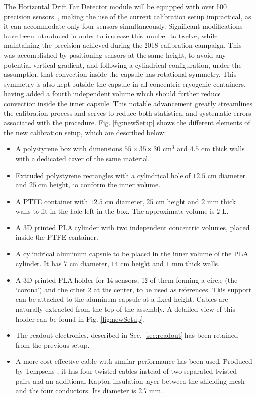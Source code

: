 \noindent The Horizontal Drift Far Detector module will be equipped with over 500 precision sensors~\cite{dune_tdr4}, making the use of the current calibration setup impractical, as it can accommodate only four sensors simultaneously. Significant modifications have been introduced in order to increase this number to twelve, while maintaining the precision achieved during the 2018 calibration campaign. This was accomplished by positioning sensors at the same height, to avoid any potential vertical gradient, and following a cylindrical configuration, under the assumption that convection inside the capsule has rotational symmetry.
This symmetry is also kept outside the capsule in all concentric cryogenic containers, having added a fourth independent volume which should further reduce convection inside the inner capsule.
This notable advancement greatly streamlines the calibration process and serves to reduce both statistical and systematic errors associated with the procedure. Fig. \ref{fig:newSetup} shows the different elements of the new calibration setup, which are described below:

\begin{itemize}
    \item A polystyrene box with dimensions $55\times35\times30$ cm$^{3}$ and $4.5$ cm thick walls with a dedicated cover of the same material.
    \item Extruded polystyrene rectangles with a cylindrical hole of $12.5$ cm diameter and $25$ cm height, to conform the inner volume.
    \item A PTFE container with $12.5$ cm diameter, $25$ cm height and $2$ mm thick walls to fit in the hole left in the box. The approximate volume is $2$ L.
    \item A 3D printed PLA cylinder with two independent concentric volumes, placed inside the PTFE container.
    \item A cylindrical aluminum capsule to be placed in the inner volume of the PLA cylinder. It has $7$ cm diameter,  $14$ cm height and $1$ mm thick walls.
    \item A 3D printed PLA holder for 14 sensors, 12 of them forming a circle (the `corona') and the other 2 at the center, to be used as references. This support can be attached to the aluminum capsule at a fixed height. Cables are naturally extracted from the top of the assembly. A detailed view of this holder can be found in Fig. \ref{fig:newSetup}.
    \item The readout electronics, described in Sec.~\ref{sec:readout} has been retained from the previous setup.
    \item A more cost effective cable with similar performance has been used. Produced by Tempsens \cite{tempsens}, it has four twisted cables instead of two separated twisted pairs and an additional Kapton insulation layer between the shielding mesh and the four conductors. Its diameter is 2.7 mm.
\end{itemize}

